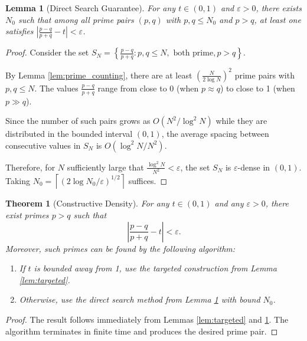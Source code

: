 \documentclass[11pt]{article}
\newtheorem{theorem}{Theorem}
\newtheorem{lemma}{Lemma}
\begin{document}
\begin{lemma}[Direct Search Guarantee]\label{lem:direct_search}
For any $t \in (0,1)$ and $\varepsilon > 0$, there exists $N_0$ such that among all prime pairs $(p,q)$ with $p, q \leq N_0$ and $p > q$, at least one satisfies $\left|\frac{p-q}{p+q} - t\right| < \varepsilon$.
\end{lemma}

\begin{proof}
Consider the set $S_N = \left\{\frac{p-q}{p+q} : p, q \leq N, \text{ both prime}, p > q\right\}$.

By Lemma \ref{lem:prime_counting}, there are at least $\left(\frac{N}{2\log N}\right)^2$ prime pairs with $p, q \leq N$. The values $\frac{p-q}{p+q}$ range from close to 0 (when $p \approx q$) to close to 1 (when $p \gg q$).

Since the number of such pairs grows as $O(N^2/\log^2 N)$ while they are distributed in the bounded interval $(0,1)$, the average spacing between consecutive values in $S_N$ is $O(\log^2 N / N^2)$.

Therefore, for $N$ sufficiently large that $\frac{\log^2 N}{N^2} < \varepsilon$, the set $S_N$ is $\varepsilon$-dense in $(0,1)$. Taking $N_0 = \left\lceil (2\log N_0 / \varepsilon)^{1/2} \right\rceil$ suffices.
\end{proof}

\begin{theorem}[Constructive Density]\label{thm:constructive}
For any $t \in (0, 1)$ and any $\varepsilon > 0$, there exist primes $p > q$ such that
\begin{equation}
\left|\frac{p - q}{p + q} - t\right| < \varepsilon.
\end{equation}
Moreover, such primes can be found by the following algorithm:
\begin{enumerate}
\item If $t$ is bounded away from 1, use the targeted construction from Lemma \ref{lem:targeted}.
\item Otherwise, use the direct search method from Lemma \ref{lem:direct_search} with bound $N_0$.
\end{enumerate}
\end{theorem}

\begin{proof}
The result follows immediately from Lemmas \ref{lem:targeted} and \ref{lem:direct_search}. The algorithm terminates in finite time and produces the desired prime pair.
\end{proof}
\end{document}

